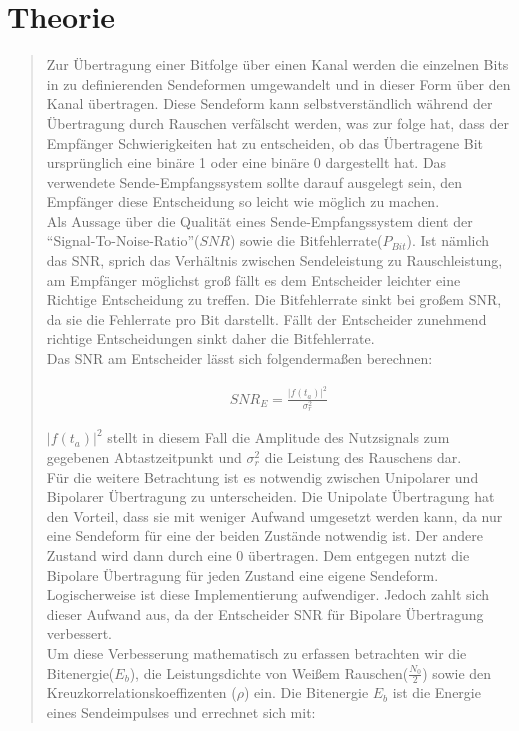 \section{Theorie}
\begin{quote}

    Zur Übertragung einer Bitfolge über einen Kanal werden die einzelnen Bits in zu definierenden Sendeformen
    umgewandelt und in dieser Form über den Kanal übertragen. Diese Sendeform kann selbstverständlich während der
    Übertragung durch Rauschen verfälscht werden, was zur folge hat, dass der Empfänger Schwierigkeiten hat zu
    entscheiden, ob das Übertragene Bit ursprünglich eine binäre 1 oder eine  binäre 0 dargestellt hat. Das verwendete
    Sende-Empfangssystem sollte darauf ausgelegt sein, den Empfänger diese Entscheidung so leicht wie möglich zu
    machen.\\
    Als Aussage über die Qualität eines Sende-Empfangssystem dient der ``Signal-To-Noise-Ratio''($SNR$) sowie die
    Bitfehlerrate($P_{Bit}$). Ist nämlich das SNR, sprich das Verhältnis zwischen Sendeleistung zu Rauschleistung, am
    Empfänger möglichst groß fällt es dem Entscheider leichter eine Richtige Entscheidung zu treffen. Die Bitfehlerrate
    sinkt bei großem SNR, da sie die Fehlerrate pro Bit darstellt. Fällt der Entscheider zunehmend richtige
    Entscheidungen sinkt daher die Bitfehlerrate.\\
    Das SNR am Entscheider lässt sich folgendermaßen berechnen:
    
    \begin{equation*}
    	\begin{split}
    		SNR_E = \frac{|f(t_a)|^2}{\sigma_r^2}
    	\end{split}
    \end{equation*}
    
    $|f(t_a)|^2$ stellt in diesem Fall die Amplitude des Nutzsignals zum gegebenen Abtastzeitpunkt und $\sigma_r^2$ die
    Leistung des Rauschens dar.\\
    
    Für die weitere Betrachtung ist es notwendig zwischen Unipolarer und Bipolarer Übertragung zu unterscheiden. Die
    Unipolate Übertragung hat den Vorteil, dass sie mit weniger Aufwand umgesetzt werden kann, da nur eine Sendeform für
    eine der beiden Zustände notwendig ist. Der andere Zustand wird dann durch eine 0 übertragen. Dem entgegen nutzt die
    Bipolare Übertragung für jeden Zustand eine eigene Sendeform. Logischerweise ist diese Implementierung aufwendiger.
    Jedoch zahlt sich dieser Aufwand aus, da der Entscheider SNR für Bipolare Übertragung verbessert.\\
    Um diese Verbesserung mathematisch zu erfassen betrachten wir die Bitenergie($E_b$), die Leistungsdichte von Weißem
    Rauschen($\frac{N_0}{2}$) sowie den Kreuzkorrelationskoeffizenten ($\rho$) ein. Die Bitenergie $E_b$ ist die Energie
    eines Sendeimpulses und errechnet sich mit: \cite{Bitenergie}
    

\end{quote}
